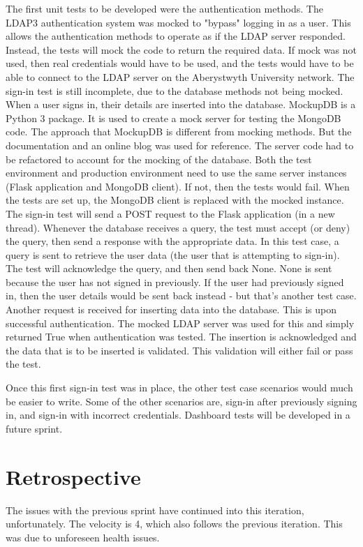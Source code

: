 The first unit tests to be developed were the authentication methods. The LDAP3 authentication system was mocked to "bypass" logging in as a user. This allows the authentication methods to operate as if the LDAP server responded. Instead, the tests will mock the code to return the required data. If mock was not used, then real credentials would have to be used, and the tests would have to be able to connect to the LDAP server on the Aberystwyth University network. The sign-in test is still incomplete, due to the database methods not being mocked. When a user signs in, their details are inserted into the database. MockupDB is a Python 3 package. It is used to create a mock server for testing the MongoDB code. The approach that MockupDB is different from mocking methods. But the documentation and an online blog was used for reference\cite{DavisMongoDB}. The server code had to be refactored to account for the mocking of the database. Both the test environment and production environment need to use the same server instances (Flask application and MongoDB client). If not, then the tests would fail. When the tests are set up, the MongoDB client is replaced with the mocked instance. The sign-in test will send a POST request to the Flask application (in a new thread). Whenever the database receives a query, the test must accept (or deny) the query, then send a response with the appropriate data. In this test case, a query is sent to retrieve the user data (the user that is attempting to sign-in). The test will acknowledge the query, and then send back None. None is sent because the user has not signed in previously. If the user had previously signed in, then the user details would be sent back instead - but that's another test case. Another request is received for inserting data into the database. This is upon successful authentication. The mocked LDAP server was used for this and simply returned True when authentication was tested. The insertion is acknowledged and the data that is to be inserted is validated. This validation will either fail or pass the test.

Once this first sign-in test was in place, the other test case scenarios would much be easier to write. Some of the other scenarios are, sign-in after previously signing in, and sign-in with incorrect credentials. Dashboard tests will be developed in a future sprint.

\section{Retrospective}
The issues with the previous sprint have continued into this iteration, unfortunately. The velocity is 4, which also follows the previous iteration. This was due to unforeseen health issues.
